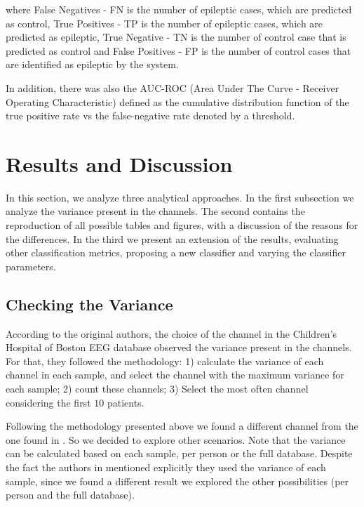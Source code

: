 \noindent where False Negatives - FN is the number of epileptic cases, which are predicted as control, True Positives - TP is the number of epileptic cases, which are predicted as epileptic, True Negative - TN is the number of control case that is predicted as control and False Positives - FP is the number of control cases that are identified as epileptic by the system. 

In addition, there was also the AUC-ROC (Area Under The Curve - Receiver Operating Characteristic) defined as the cumulative distribution function of the true positive rate vs the false-negative rate denoted by a threshold.


















\section{Results and Discussion}
\label{sec:resu}

In this section, we analyze three analytical approaches. In the first subsection we analyze the variance present in the channels. The second contains the reproduction of all possible tables and figures, with a discussion of the reasons for the differences. In the third we present an extension of the results, evaluating other classification metrics, proposing a new classifier and varying the classifier parameters.

\subsection{Checking the Variance} 

According to the original authors, the choice of the channel in the Children's Hospital of Boston EEG database observed the variance present in the channels. For that, they followed the methodology: 1) calculate the variance of each channel in each sample, and select the channel with the maximum variance for each sample; 2) count these channels; 3) Select the most often channel considering the first $10$ patients.

Following the methodology presented above we found a different channel from the one found in \cite{WenZha:2018}. So we decided to explore other scenarios. Note that the variance can be calculated based on each sample, per person or the full database. Despite the fact the authors in \cite{WenZha:2018} mentioned explicitly they used the variance of each sample, since we found a different result we explored the other possibilities (per person and the full database).

